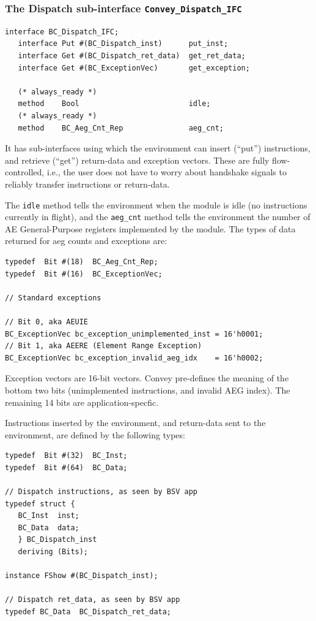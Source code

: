 \documentclass[twoside,letterpaper,11pt]{article}
\begin{document}

\subsubsection{The Dispatch sub-interface {\tt Convey\_Dispatch\_IFC}}

\label{sec_dispatch_ifc}
  
\begin{Verbatim}[frame=single, label=BC\_HW\_IFC.bsv]
interface BC_Dispatch_IFC;
   interface Put #(BC_Dispatch_inst)      put_inst;
   interface Get #(BC_Dispatch_ret_data)  get_ret_data;
   interface Get #(BC_ExceptionVec)       get_exception;

   (* always_ready *)
   method    Bool                         idle;
   (* always_ready *)
   method    BC_Aeg_Cnt_Rep               aeg_cnt;
\end{Verbatim}
It has sub-interfaces using which the environment can insert (``put'')
instructions, and retrieve (``get'') return-data and exception
vectors.  These are fully flow-controlled, i.e., the user does not
have to worry about handshake signals to reliably transfer
instructions or return-data.

The \verb|idle| method tells the environment when the
module is idle (no instructions currently in flight), and the
\verb|aeg_cnt| method tells the environment the number of AE
General-Purpose registers implemented by the module.  The types of
data returned for aeg counts and exceptions are:
\begin{Verbatim}[frame=single, label=BC\_HW\_IFC.bsv]
typedef  Bit #(18)  BC_Aeg_Cnt_Rep;
typedef  Bit #(16)  BC_ExceptionVec;

// Standard exceptions

// Bit 0, aka AEUIE
BC_ExceptionVec bc_exception_unimplemented_inst = 16'h0001;
// Bit 1, aka AEERE (Element Range Exception)
BC_ExceptionVec bc_exception_invalid_aeg_idx    = 16'h0002;
\end{Verbatim}
Exception vectors are 16-bit vectors.  Convey pre-defines the meaning
of the bottom two bits (unimplemented instructions, and invalid AEG
index).  The remaining 14 bits are application-specfic.

Instructions inserted by the environment, and return-data sent to the
environment, are defined by the following types:

\begin{Verbatim}[frame=single, label=BC\_HW\_IFC.bsv]
typedef  Bit #(32)  BC_Inst;
typedef  Bit #(64)  BC_Data;

// Dispatch instructions, as seen by BSV app
typedef struct {
   BC_Inst  inst;
   BC_Data  data;
   } BC_Dispatch_inst
   deriving (Bits);

instance FShow #(BC_Dispatch_inst);

// Dispatch ret_data, as seen by BSV app
typedef BC_Data  BC_Dispatch_ret_data;
\end{Verbatim}
\end{document}
